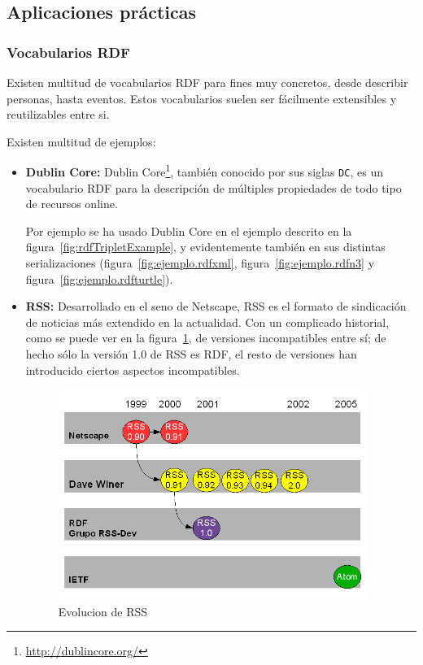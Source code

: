 \subsection{Aplicaciones prácticas}

\subsubsection{Vocabularios RDF}

Existen multitud de vocabularios RDF para fines muy concretos, desde describir
personas, hasta eventos. Estos vocabularios suelen ser fácilmente extensibles y 
reutilizables entre si.

Existen multitud de ejemplos:

\begin{itemize}
  \item \textbf{Dublin Core\label{sec:dc}:} Dublin Core\footnote{\url{http://dublincore.org/}}, 
	también conocido por sus siglas \texttt{DC}, es un vocabulario RDF para la descripción 
	de múltiples propiedades de todo tipo de recursos online.

	Por ejemplo se ha usado Dublin Core en el ejemplo descrito en la 
	figura~\ref{fig:rdfTripletExample}, y evidentemente también en sus distintas 
	serializaciones (figura~\ref{fig:ejemplo.rdfxml}, figura~\ref{fig:ejemplo.rdfn3} 
	y figura~\ref{fig:ejemplo.rdfturtle}).

  \item \textbf{RSS:} Desarrollado en el seno de Netscape, RSS es el formato de sindicación de 
	noticias más extendido en la actualidad. Con un complicado historial, como se puede ver 
	en la figura~\ref{fig:rssEvolution}, de versiones incompatibles entre sí; de hecho sólo 
	la versión 1.0 de RSS es RDF, el resto de versiones han introducido ciertos aspectos
	incompatibles.

	\begin{figure}[H]
		\centering
		\includegraphics[width=10cm]{images/rssEvolution.png}
		\caption{Evolucion de RSS}
		\label{fig:rssEvolution}
	\end{figure}


\end{itemize}
